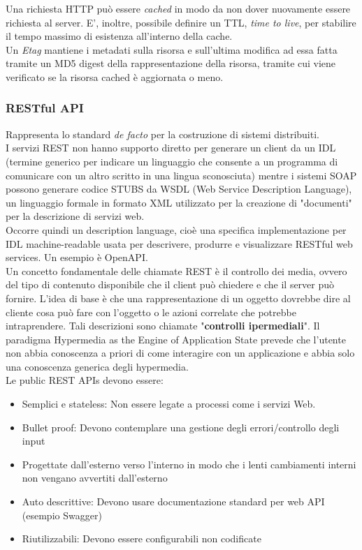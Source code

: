 \documentclass{article}
\begin{document}
		\newpage
		Una richiesta HTTP può essere \textit{cached} in modo da non dover nuovamente essere richiesta al server. E', inoltre, possibile definire un TTL, \textit{time to live}, per stabilire il tempo massimo di esistenza all'interno della cache.\\
		Un \textit{Etag} mantiene i metadati sulla risorsa e sull'ultima modifica ad essa fatta tramite un MD5 digest della rappresentazione della risorsa, tramite cui viene verificato se la risorsa cached è aggiornata o meno.

		\subsubsection{RESTful API}
		Rappresenta lo standard \textit{de facto} per la costruzione di sistemi distribuiti.\\
		I servizi REST non hanno supporto diretto per generare un client da un IDL (termine generico per indicare un linguaggio che consente a un programma di comunicare con un altro scritto in una lingua sconosciuta) mentre i sistemi SOAP possono generare codice STUBS da WSDL (Web Service Description Language), un linguaggio formale in formato XML utilizzato per la creazione di "documenti" per la descrizione di servizi web.\\
		
		Occorre quindi un description language, cioè una specifica implementazione per IDL machine-readable usata per descrivere, produrre e visualizzare RESTful web services. Un esempio è OpenAPI.\\
		
		Un concetto fondamentale delle chiamate REST è il controllo dei media, ovvero del tipo di contenuto disponibile che il client può chiedere e che il server può fornire. 
		L'idea di base è che una rappresentazione di un oggetto dovrebbe dire al cliente cosa può fare con l'oggetto o le azioni correlate che potrebbe intraprendere.
		Tali descrizioni sono chiamate "\textbf{controlli ipermediali}". Il paradigma Hypermedia as the Engine of Application State prevede che l'utente non abbia conoscenza a priori di come interagire con un applicazione e abbia solo una conoscenza generica degli hypermedia.\\
		
		Le public REST APIs devono essere:
		\begin{itemize}
		    \item Semplici e stateless: Non essere legate a processi come i servizi Web.
		    \item Bullet proof: Devono contemplare una gestione degli errori/controllo degli input
		    \item Progettate dall'esterno verso l'interno in modo che i lenti cambiamenti interni non vengano avvertiti dall'esterno
		    \item Auto descrittive: Devono usare documentazione standard per web API (esempio Swagger)
		    \item Riutilizzabili: Devono essere configurabili non codificate
		\end{itemize}
		
\end{document}
